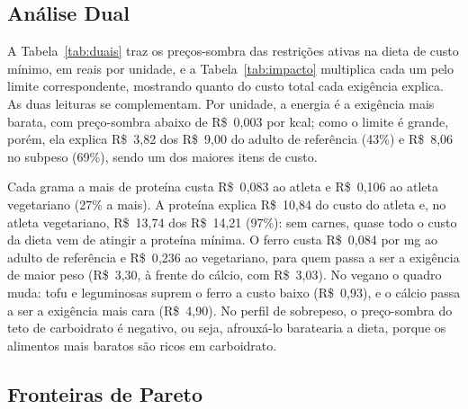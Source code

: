 \documentclass[12pt]{article}
\begin{document}
\subsection{Análise Dual}

A Tabela~\ref{tab:duais} traz os preços-sombra das restrições ativas na dieta de custo
mínimo, em reais por unidade, e a Tabela~\ref{tab:impacto} multiplica cada um pelo
limite correspondente, mostrando quanto do custo total cada exigência explica. As duas
leituras se complementam. Por unidade, a energia é a exigência mais barata, com
preço-sombra abaixo de R\$~0,003 por kcal; como o limite é grande, porém, ela explica
R\$~3{,}82 dos R\$~9{,}00 do adulto de referência (43\%) e
R\$~8{,}06 no subpeso (69\%), sendo um dos maiores itens de custo.

Cada grama a mais de proteína custa R\$~0{,}083 ao atleta e
R\$~0{,}106 ao atleta vegetariano (27\% a mais). A proteína
explica R\$~10{,}84 do custo do atleta e, no atleta vegetariano,
R\$~13{,}74 dos R\$~14{,}21 (97\%): sem carnes, quase todo
o custo da dieta vem de atingir a proteína mínima. O ferro custa R\$~0{,}084 por
mg ao adulto de referência e R\$~0{,}236 ao vegetariano, para quem passa a ser a
exigência de maior peso (R\$~3{,}30, à frente do cálcio, com
R\$~3{,}03). No vegano o quadro muda: tofu e leguminosas suprem o ferro a custo
baixo (R\$~0{,}93), e o cálcio passa a ser a exigência mais cara
(R\$~4{,}90). No perfil de sobrepeso, o preço-sombra do teto de carboidrato é
negativo, ou seja, afrouxá-lo baratearia a dieta, porque os alimentos mais baratos são
ricos em carboidrato.

\begin{table}[ht]
\centering
\caption{Preços-sombra na dieta de custo mínimo (R\$ por unidade; ``--'' indica
restrição não ativa).}\label{tab:duais}
\footnotesize

\end{table}

\begin{table}[ht]
\centering
\caption{Impacto de cada exigência no custo mínimo diário (preço-sombra $\times$
limite, em R\$). A linha dos limites de porção completa a soma pela dualidade forte.}\label{tab:impacto}
\footnotesize

\end{table}

\subsection{Fronteiras de Pareto}
\end{document}
